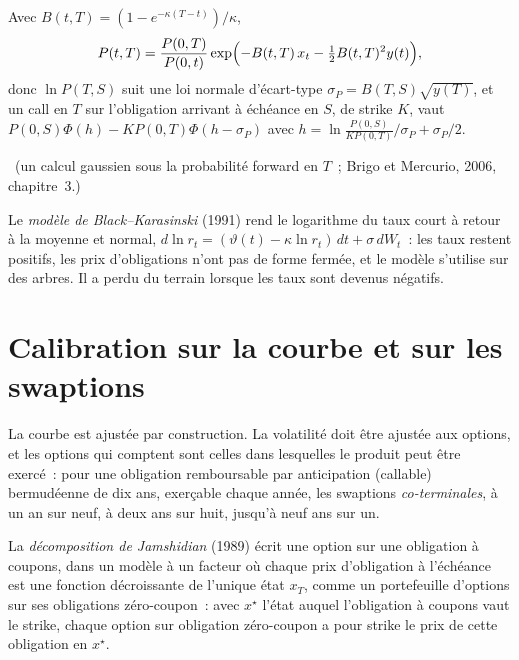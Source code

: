 \begin{proposition}\label{prop:rc:short-rate-models:hwbond}
Avec $B(t,T) = (1-e^{-\kappa(T-t)})/\kappa$,
\[
P(t,T) = \frac{P(0,T)}{P(0,t)}\exp\Bigl(-B(t,T)\,x_t-\tfrac12B(t,T)^2y(t)\Bigr),
\]
donc $\ln P(T,S)$ suit une loi normale d'écart-type $\sigma_P = B(T,S)\sqrt{y(T)}$, et un
call en $T$ sur l'obligation arrivant à échéance en $S$, de strike $K$, vaut
$P(0,S)\Phi(h)-KP(0,T)\Phi(h-\sigma_P)$ avec $h = \ln\frac{P(0,S)}{KP(0,T)}/\sigma_P+\sigma_P/2$.
\end{proposition}
\admitted\ (un calcul gaussien sous la probabilité forward en $T$~; Brigo et
Mercurio, 2006, chapitre~3.)

\begin{definition}\label{def:rc:short-rate-models:bk}
Le \emph{modèle de Black--Karasinski} (1991) rend
le logarithme du taux court à retour à la moyenne et normal, $d\ln r_t =
(\vartheta(t)-\kappa\ln r_t)\,dt+\sigma\,dW_t$~: les taux restent positifs, les prix
d'obligations n'ont pas de forme fermée, et le modèle s'utilise sur des arbres. Il a
perdu du terrain lorsque les taux sont devenus négatifs.
\end{definition}

\section{Calibration sur la courbe et sur les swaptions}

La courbe est ajustée par construction. La volatilité doit être ajustée aux options,
et les options qui comptent sont celles dans lesquelles le produit peut être exercé~: pour
une obligation remboursable par anticipation (callable) bermudéenne de dix ans, exerçable chaque année, les swaptions \emph{co-terminales},
à un an sur neuf, à deux ans sur huit, jusqu'à neuf ans sur un.

\begin{definition}\label{def:rc:short-rate-models:jamshidian}
La \emph{décomposition de Jamshidian} (1989)
écrit une option sur une obligation à coupons, dans un modèle à un facteur où chaque prix
d'obligation à l'échéance est une fonction décroissante de l'unique état $x_T$, comme un portefeuille
d'options sur ses obligations zéro-coupon~: avec $x^\star$ l'état auquel l'obligation à
coupons vaut le strike, chaque option sur obligation zéro-coupon a pour strike le prix
de cette obligation en $x^\star$.
\end{definition}

